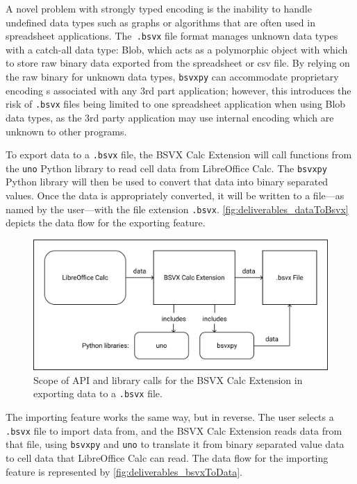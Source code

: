 \documentclass[10pt]{article}
\begin{document}
\indent{}
A novel problem with strongly typed encoding is the inability to handle undefined data types such as graphs or algorithms that are often used in spreadsheet applications.
The\texttt{ .bsvx} file format manages unknown data types with a catch-all data type: Blob, which acts as a polymorphic object with which to store raw binary data exported from the spreadsheet or csv file.
By relying on the raw binary for unknown data types, \texttt{bsvxpy} can accommodate proprietary encoding s associated with any 3rd part application; however,
this introduces the risk of \texttt{.bsvx} files being limited to one spreadsheet application when using Blob data types, as the 3rd party application may use internal encoding which are unknown to other programs.

\indent{}
To export data to a \texttt{.bsvx} file, the BSVX Calc Extension will call functions from the \texttt{uno} Python library to read cell data from LibreOffice Calc.
The \texttt{bsvxpy} Python library will then be used to convert that data into binary separated values.
Once the data is appropriately converted, it will be written to a file---as named by the user---with the file extension \texttt{.bsvx}.
\autoref{fig:deliverables_dataToBsvx} depicts the data flow for the exporting feature.

\begin{figure}[H]
\centering
\includegraphics[width=5in]{figures/dataToBsvx.png}
\caption{Scope of API and library calls for the BSVX Calc Extension in exporting data to a \texttt{.bsvx} file.}
\label{fig:deliverables_dataToBsvx}
\end{figure}
\newpage

\indent{}
The importing feature works the same way, but in reverse.
The user selects a \texttt{.bsvx} file to import data from, and the BSVX Calc Extension reads data from that file, using \texttt{bsvxpy} and \texttt{uno} to translate it from binary separated value data to cell data that LibreOffice Calc can read.
The data flow for the importing feature is represented by \autoref{fig:deliverables_bsvxToData}.
    
\end{document}
